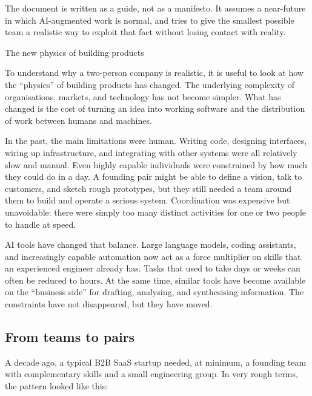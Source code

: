 \documentclass[10pt, a4paper, twocolumn]{article} %
\makeatletter
\let\orig@section\section %
\renewcommand{\section}{%
  \@ifstar{\orig@section*}{\unnumberedsteppingsection}%
}
\newcommand{\unnumberedsteppingsection}[1]{%
  \refstepcounter{section}%
  \orig@section*{#1}%
}
\makeatother
\begin{document}
The document is written as a guide, not as a manifesto. It assumes a near-future in which AI-augmented work is normal, and tries to give the smallest possible team a realistic way to exploit that fact without losing contact with reality.


\newpage


\section{The new physics of building products}

To understand why a two-person company is realistic, it is useful to look at how the “physics” of building products has changed. The underlying complexity of organisations, markets, and technology has not become simpler. What has changed is the cost of turning an idea into working software and the distribution of work between humans and machines.

In the past, the main limitations were human. Writing code, designing interfaces, wiring up infrastructure, and integrating with other systems were all relatively slow and manual. Even highly capable individuals were constrained by how much they could do in a day. A founding pair might be able to define a vision, talk to customers, and sketch rough prototypes, but they still needed a team around them to build and operate a serious system. Coordination was expensive but unavoidable: there were simply too many distinct activities for one or two people to handle at speed.

AI tools have changed that balance. Large language models, coding assistants, and increasingly capable automation now act as a force multiplier on skills that an experienced engineer already has. Tasks that used to take days or weeks can often be reduced to hours. At the same time, similar tools have become available on the “business side” for drafting, analysing, and synthesising information. The constraints have not disappeared, but they have moved.

\subsection{From teams to pairs}

A decade ago, a typical B2B SaaS startup needed, at minimum, a founding team with complementary skills and a small engineering group. In very rough terms, the pattern looked like this:
\end{document}
